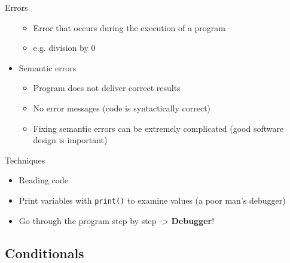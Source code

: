 \documentclass[10pt, a4paper]{beamer} %
\begin{document}
\begin{frame}[c,allowframebreaks]
\begin{block}{Errors}
\begin{itemize}
    \begin{itemize}
        \item Error that occurs during the execution of a program
        \item e.g. division by 0
    \end{itemize}
        \item Semantic errors
        \begin{itemize}
            \item Program does not deliver correct results
            \item No error messages (code is syntactically correct)
            \item Fixing semantic errors can be extremely complicated (good software design is important)
        \end{itemize}
    \end{itemize}
\end{block}
\framebreak
\begin{block}{Techniques}
\begin{itemize}
        \item Reading code
        \item Print variables with \lstinline!print()! to examine values (a poor man's debugger)
        \item Go through the program step by step -> \textbf{Debugger}!
    \end{itemize}    
\end{block}
    


\end{frame}

\subsection{Conditionals} %
\label{sub:conditionals}
\end{document}
